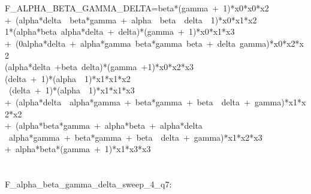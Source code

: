 \begin{tabbing}
\\[0pt]
\\[0pt]
F\_ALPHA\_BETA\_GAMMA\_DELTA=beta*(gamma\ +\ 1)*x0*x0*x2\ \\[0pt]
+\ (alpha*delta\ \ beta*gamma\ +\ alpha\ \ beta\ \ delta\ \ 1)*x0*x1*x2\ \\[0pt]
1*(alpha*beta\ alpha*delta\ +\ delta)*(gamma\ +\ 1)*x0*x1*x3\ \\[0pt]
+\ (0alpha*delta\ +\ alpha*gamma\ beta*gamma\ beta\ +\ delta\ gamma)*x0*x2*x2\ \\[0pt]
(alpha*delta\ +beta\ delta)*(gamma\ +1)*x0*x2*x3\ \\[0pt]
(delta\ +\ 1)*(alpha\ \ 1)*x1*x1*x2\ \\[0pt]
\ (delta\ +\ 1)*(alpha\ \ 1)*x1*x1*x3\ \\[0pt]
+\ (alpha*delta\ \ alpha*gamma\ +\ beta*gamma\ +\ beta\ \ delta\ +\ gamma)*x1*x2*x2\ \\[0pt]
+\ (alpha*beta*gamma\ +\ alpha*beta\ +\ alpha*delta\ \\[0pt]
\ alpha*gamma\ +\ beta*gamma\ +\ beta\ \ delta\ +\ gamma)*x1*x2*x3\ \\[0pt]
+\ alpha*beta*(gamma\ +\ 1)*x1*x3*x3\\[0pt]
\\[0pt]
\\[0pt]
F\_alpha\_beta\_gamma\_delta\_sweep\_4\_q7:\\[0pt]

\end{tabbing}
